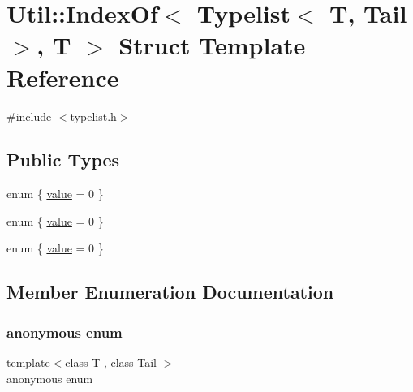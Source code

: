 \hypertarget{structUtil_1_1TL_1_1IndexOf_3_01Typelist_3_01T_00_01Tail_01_4_00_01T_01_4}{}\section{Util\+:\+:Index\+Of$<$ Typelist$<$ T, Tail $>$, T $>$ Struct Template Reference}
\label{structUtil_1_1TL_1_1IndexOf_3_01Typelist_3_01T_00_01Tail_01_4_00_01T_01_4}


{\ttfamily \#include $<$typelist.\+h$>$}

\subsection*{Public Types}
\begin{DoxyCompactItemize}
\item 
enum \{ \mbox{\hyperlink{structUtil_1_1TL_1_1IndexOf_3_01Typelist_3_01T_00_01Tail_01_4_00_01T_01_4_a7f1c2a216d1b42b3f00654bec9534b57a22f5ae7c317cc5ff18969cdbc7d3477f}{value}} = 0
 \}
\item 
enum \{ \mbox{\hyperlink{structUtil_1_1TL_1_1IndexOf_3_01Typelist_3_01T_00_01Tail_01_4_00_01T_01_4_a7f1c2a216d1b42b3f00654bec9534b57a22f5ae7c317cc5ff18969cdbc7d3477f}{value}} = 0
 \}
\item 
enum \{ \mbox{\hyperlink{structUtil_1_1TL_1_1IndexOf_3_01Typelist_3_01T_00_01Tail_01_4_00_01T_01_4_a7f1c2a216d1b42b3f00654bec9534b57a22f5ae7c317cc5ff18969cdbc7d3477f}{value}} = 0
 \}
\end{DoxyCompactItemize}


\subsection{Member Enumeration Documentation}
\mbox{\label{structUtil_1_1TL_1_1IndexOf_3_01Typelist_3_01T_00_01Tail_01_4_00_01T_01_4_a20109fc3938d086bab717994613be888}} 
\subsubsection{\texorpdfstring{anonymous enum}{anonymous enum}}
{\footnotesize\ttfamily template$<$class T , class Tail $>$ \\
anonymous enum}

